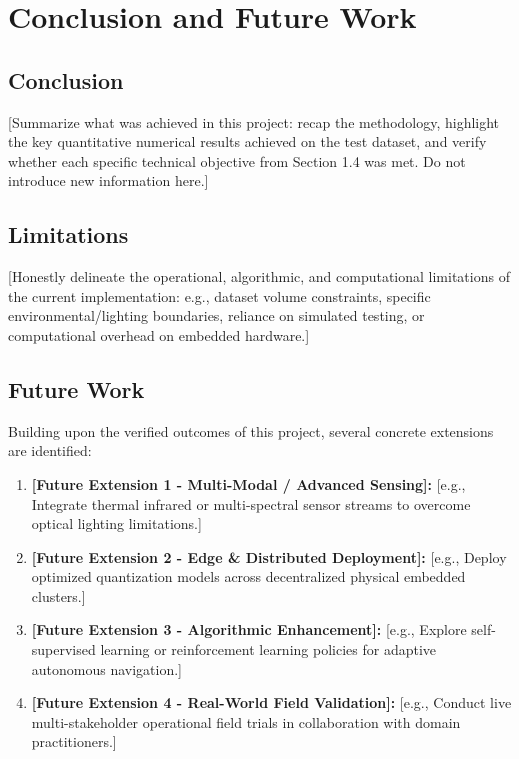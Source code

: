 \chapter{Conclusion and Future Work}

\section{Conclusion}
[Summarize what was achieved in this project: recap the methodology, highlight the key quantitative numerical results achieved on the test dataset, and verify whether each specific technical objective from Section 1.4 was met. Do not introduce new information here.]

\section{Limitations}
[Honestly delineate the operational, algorithmic, and computational limitations of the current implementation: e.g., dataset volume constraints, specific environmental/lighting boundaries, reliance on simulated testing, or computational overhead on embedded hardware.]

\section{Future Work}
Building upon the verified outcomes of this project, several concrete extensions are identified:
\begin{enumerate}
    \item \textbf{[Future Extension 1 - Multi-Modal / Advanced Sensing]:} [e.g., Integrate thermal infrared or multi-spectral sensor streams to overcome optical lighting limitations.]
    \item \textbf{[Future Extension 2 - Edge \& Distributed Deployment]:} [e.g., Deploy optimized quantization models across decentralized physical embedded clusters.]
    \item \textbf{[Future Extension 3 - Algorithmic Enhancement]:} [e.g., Explore self-supervised learning or reinforcement learning policies for adaptive autonomous navigation.]
    \item \textbf{[Future Extension 4 - Real-World Field Validation]:} [e.g., Conduct live multi-stakeholder operational field trials in collaboration with domain practitioners.]
\end{enumerate}
